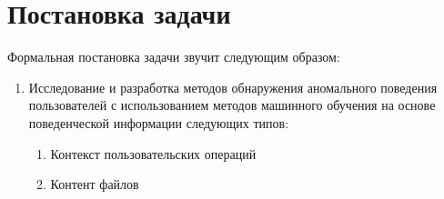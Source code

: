\section{Постановка задачи}
Формальная постановка задачи звучит следующим образом:
\begin{enumerate}
\item Исследование и разработка методов обнаружения аномального поведения пользователей с использованием методов машинного обучения на основе поведенческой информации следующих типов:
\begin{enumerate}
\item Контекст пользовательских операций
\item Контент файлов
\end{enumerate}
\end{enumerate}
\clearpage